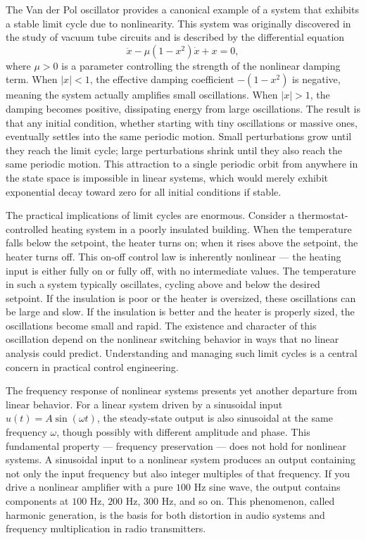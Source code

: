 The Van der Pol oscillator provides a canonical example of a system that exhibits a stable limit cycle due to nonlinearity. This system was originally discovered in the study of vacuum tube circuits and is described by the differential equation
\begin{equation}
\ddot{x} - \mu(1-x^2)\dot{x} + x = 0,
\end{equation}
where $\mu > 0$ is a parameter controlling the strength of the nonlinear damping term. When $|x| < 1$, the effective damping coefficient $-(1-x^2)$ is negative, meaning the system actually amplifies small oscillations. When $|x| > 1$, the damping becomes positive, dissipating energy from large oscillations. The result is that any initial condition, whether starting with tiny oscillations or massive ones, eventually settles into the same periodic motion. Small perturbations grow until they reach the limit cycle; large perturbations shrink until they also reach the same periodic motion. This attraction to a single periodic orbit from anywhere in the state space is impossible in linear systems, which would merely exhibit exponential decay toward zero for all initial conditions if stable.

The practical implications of limit cycles are enormous. Consider a thermostat-controlled heating system in a poorly insulated building. When the temperature falls below the setpoint, the heater turns on; when it rises above the setpoint, the heater turns off. This on-off control law is inherently nonlinear --- the heating input is either fully on or fully off, with no intermediate values. The temperature in such a system typically oscillates, cycling above and below the desired setpoint. If the insulation is poor or the heater is oversized, these oscillations can be large and slow. If the insulation is better and the heater is properly sized, the oscillations become small and rapid. The existence and character of this oscillation depend on the nonlinear switching behavior in ways that no linear analysis could predict. Understanding and managing such limit cycles is a central concern in practical control engineering.

The frequency response of nonlinear systems presents yet another departure from linear behavior. For a linear system driven by a sinusoidal input $u(t) = A\sin(\omega t)$, the steady-state output is also sinusoidal at the same frequency $\omega$, though possibly with different amplitude and phase. This fundamental property --- frequency preservation --- does not hold for nonlinear systems. A sinusoidal input to a nonlinear system produces an output containing not only the input frequency but also integer multiples of that frequency. If you drive a nonlinear amplifier with a pure $100$ Hz sine wave, the output contains components at $100$ Hz, $200$ Hz, $300$ Hz, and so on. This phenomenon, called harmonic generation, is the basis for both distortion in audio systems and frequency multiplication in radio transmitters.

